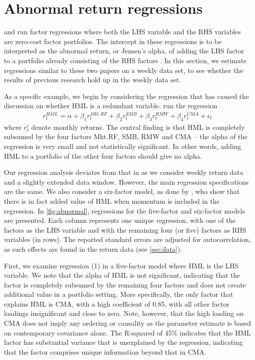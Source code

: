 
\section{Abnormal return regressions}
\label{sec:alpha_reg}
\textcite{FF2015} and \textcite{Asness2015} run factor regressions where both the LHS variable and the RHS variables are zero-cost factor portfolios. The intercept in these regressions is to be interpreted as the abnormal return, or Jensen's alpha, of adding the LHS factor to a portfolio already consisting of the RHS factors \autocite{Jensen1968}. In this section, we estimate regressions similar to these two papers on a weekly data set, to see whether the results of previous research hold up in the weekly data set.

As a specific example, we begin by considering the regression that has caused the discussion on whether HML is a redundant variable. \textcite{FF2015} run the regression
\begin{align}
  r^{HML}_t = \alpha + \beta_1 r^{Mkt.RF}_t + \beta_2 r^{SMB}_t + \beta_3 r^{RMW}_t + \beta_4 r^{CMA}_t + \epsilon_t
\end{align}
where $r^i_t$ denote monthly returns. The central finding is that HML is completely subsumed by the four factors Mkt.RF, SMB, RMW and CMA -- the alpha of the regression is very small and not statistically significant. In other words, adding HML to a portfolio of the other four factors should give no alpha.

Our regression analysis deviates from that in \textcite{FF2015} as we consider weekly return data and a slightly extended data window. However, the main regression specifications are the same. We also consider a six-factor model, as done by \textcite{Asness2015}, who show that there is in fact added value of HML when momentum is included in the regression. In \autoref{fig:abnormal}, regressions for the five-factor and six-factor models are presented. Each column represents one unique regression, with one of the factors as the LHS variable and with the remaining four (or five) factors as RHS variables (in rows). The reported standard errors are adjusted for autocorrelation, as such effects are found in the return data (see \autoref{sec:data}).

First, we examine regression (1) in a five-factor model where HML is the LHS variable. We note that the alpha of HML is not significant, indicating that the factor is completely subsumed by the remaining four factors and does not create additional value in a portfolio setting. More specifically, the only factor that explains HML is CMA, with a high coefficient of 0.85, with all other factor loadings insignificant and close to zero. Note, however, that the high loading on CMA does not imply any ordering or causality as the parameter estimate is based on contemporary covariance alone. The R-squared of 45\% indicates that the HML factor has substantial variance that is unexplained by the regression, indicating that the factor comprises unique information beyond that in CMA.

